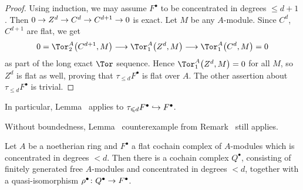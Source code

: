 \documentclass[a4paper,parskip=half,numbers=enddot, DIV=12]{scrreprt}
\renewcommand{\leq}{\leqslant}
\begin{document}
\begin{proof}
	Using induction, we may assume $F^\bullet$ to be concentrated in degrees $\leq d+1$. Then $0\morphism Z^d\morphism C^d\morphism C^{d+1}\morphism 0$ is exact. Let $M$ be any $A$-module. Since $C^d$, $C^{d+1}$ are flat, we get
	\begin{align*}
		0=\Tor_2^A\big(C^{d+1},M\big)\morphism \Tor_1^A\big(Z^d,M\big)\morphism \Tor_1^A\big(C^{d},M\big)=0
	\end{align*}
	as part of the long exact $\Tor$ sequence. Hence $\Tor_1^A\big(Z^d,M\big)=0$ for all $M$, so $Z^d$ is flat as well, proving that $\tau_{\leq d}F^\bullet$ is flat over $A$. The other assertion about $\tau_{\leq d}F^\bullet$ is trivial.
\end{proof}
\begin{rem}
	\begin{alphanumerate}
		\item In particular, Lemma~ applies to $\tau_{\leq d}F^\bullet\monomorphism F^\bullet$.
		\item Without boundedness, Lemma~ counterexample from Remark~ still applies.
	\end{alphanumerate}
\end{rem}
\begin{lem}
	Let $A$ be a noetherian ring and $F^\bullet$ a flat cochain complex of $A$-modules which is concentrated in degrees $< d$. Then there is a cochain complex $Q^\bullet$, consisting of finitely generated free $A$-modules and concentrated in degrees $<d$, together with a quasi-isomorphism $\rho^\bullet\colon Q^\bullet\morphism F^\bullet$.
\end{lem}
\end{document}
